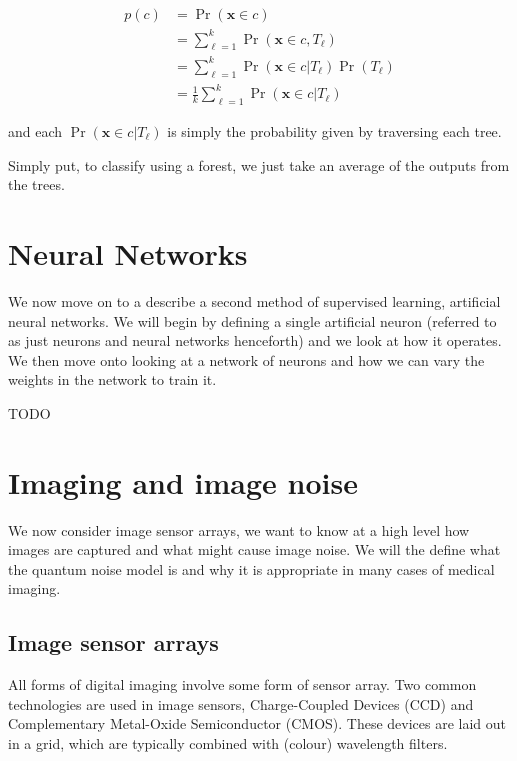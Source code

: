 \documentclass[12pt,twoside,notitlepage]{report}
\newcommand{\vc}[1]{\mathbf{#1}}
\begin{document}
            \begin{align}
                p(c) & = \Pr(\vc{x} \in c) \\
                    & = \sum_{\ell=1}^k \Pr(\vc{x} \in c, T_\ell) \\
                    & = \sum_{\ell=1}^k \Pr(\vc{x} \in c | T_\ell) \Pr(T_\ell) \\
                    & = \frac{1}{k} \sum_{\ell=1}^k \Pr(\vc{x} \in c | T_\ell)
            \end{align}

            and each $\Pr(\vc{x} \in c | T_\ell)$ is simply the probability given by traversing each tree. \cite{criminisi2013decision}

            Simply put, to classify using a forest, we just take an average of the outputs from the trees. 





    \section{Neural Networks}
        We now move on to a describe a second method of supervised learning, artificial neural networks. We will begin 
        by defining a single artificial neuron (referred to as just neurons and neural networks henceforth) and we look 
        at how it operates. We then move onto looking at a network of neurons and how we can vary the weights in the 
        network to train it. 

        \begin{framed}
            TODO
        \end{framed}





    \section{Imaging and image noise} 
        We now consider image sensor arrays, we want to know at a high level how images are captured and what might 
        cause image noise. We will the define what the quantum noise model is and why it is appropriate in many 
        cases of medical imaging. 

        \subsection{Image sensor arrays}
            All forms of digital imaging involve some form of sensor array. Two common technologies are used in image 
            sensors, Charge-Coupled Devices (CCD) and Complementary Metal-Oxide Semiconductor (CMOS). These devices are 
            laid out in a grid, which are typically combined with (colour) wavelength filters. 
\end{document}
